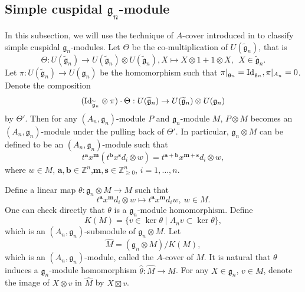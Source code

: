 \documentclass[12pt,a4paper]{amsart}
\def\mg{g}%
\numberwithin{equation}{section}
\newcommand{\C}{\mathbb C}
\newcommand{\Z}{\mathbb{Z}}
\def\mg{\mathfrak{g}}
\def\ba{\mathbf{a}}
\def\bs{\mathbf{s}}
\def\bm{\mathbf{m}}
\def\bb{\mathbf{b}}
\begin{document}
\subsection{Simple cuspidal $\mg_n$-module}

In this subsection, we will use the technique of  $A$-cover introduced in \cite{BF1} to classify simple cuspidal $\mg_n$-modules.
Let $\Theta$ be the co-multiplication of $U(\widetilde{\mg}_n)$, that is
$$\Theta: U(\widetilde{\mg}_n)\rightarrow U(\widetilde{\mg}_n)\otimes U(\widetilde{\mg}_n), X\mapsto X\otimes 1+1\otimes X,\  \ X\in \widetilde{\mg}_n.$$
Let $\pi: U(\widetilde{\mg}_n)\rightarrow U(\mg_n)$ be the homomorphism such that
$\pi |_{\mg_n}=\textup{Id}_{\mg_n}, \pi |_{A_n}=0$. Denote the composition $$(\textup{Id}_{\widetilde{\mg}_n}\otimes \pi)\cdot\Theta: U(\widetilde{\mg}_n)\rightarrow U(\widetilde{\mg}_n)\otimes U(\mg_n)$$ by $\Theta'$.
Then for any $(A_n,\mg_n)$-module $P$ and $\mg_n$-module $M$, $P\otimes M$ becomes an $(A_n,\mg_n)$-module under the pulling back of $\Theta'$. In particular,
$\mg_n\otimes M$ can be defined to be an $(A_n,\mg_n)$-module such that
$$t^{\ba}x^\bm  (t^{\bb}x^{\bs}d_i\otimes w)=t^{\ba+\bb}x^{\bm+\bs}d_i\otimes w,$$
where $w\in M$, $\ba,\bb\in \Z^n$,$\bm, \bs\in\Z_{\geq 0}^n$, $i=1,\dots,n$.


Define a linear map $\theta: \mg_n\otimes M\rightarrow M$ such that
$$t^{\ba}x^\bm d_i\otimes w\mapsto t^{\ba}x^\bm d_i w, \ w\in M.$$
One can check directly that $\theta$ is a $\mg_n$-module homomorphism.
Define
$$K(M)=\{ v\in \ker\theta \mid A_n  v\subset \ker \theta\},$$
which is an $(A_n,\mg_n)$-submodule of $\mg_n\otimes M$.
Let
$$\widehat{M}=(\mg_n\otimes M)/K(M),$$
 which is an $(A_n,\mg_n)$-module, called the $A$-cover of
$M$. It is natural that $\theta$ induces a $\mg_n$-module homomorphism
$\hat{\theta}: \widehat{M}\rightarrow M$. For any $X\in \mg_n$, $v\in M$,
denote the image of $X\otimes v$ in $\widehat{M}$ by $X\boxtimes v$.

%
\end{document}
